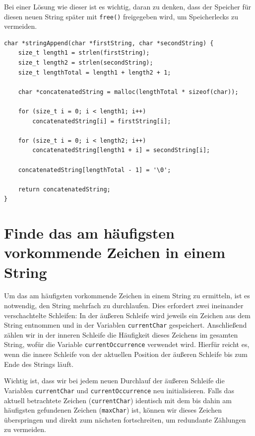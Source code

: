 Bei einer Lösung wie dieser ist es wichtig, daran zu denken, dass der Speicher
für diesen neuen String später mit \texttt{free()} freigegeben wird, um
Speicherlecks zu vermeiden.

\begin{verbatim}
char *stringAppend(char *firstString, char *secondString) {
    size_t length1 = strlen(firstString);
    size_t length2 = strlen(secondString);
    size_t lengthTotal = length1 + length2 + 1;

    char *concatenatedString = malloc(lengthTotal * sizeof(char));

    for (size_t i = 0; i < length1; i++)
        concatenatedString[i] = firstString[i];

    for (size_t i = 0; i < length2; i++)
        concatenatedString[length1 + i] = secondString[i];

    concatenatedString[lengthTotal - 1] = '\0';

    return concatenatedString;
}
\end{verbatim}





\chapter{Finde das am häufigsten vorkommende Zeichen in einem String}

Um das am häufigsten vorkommende Zeichen in einem String zu ermitteln, ist es
notwendig, den String mehrfach zu durchlaufen. Dies erfordert zwei ineinander
verschachtelte Schleifen: In der äußeren Schleife wird jeweils ein Zeichen aus
dem String entnommen und in der Variablen \texttt{currentChar}
gespeichert. Anschließend zählen wir in der inneren Schleife die Häufigkeit
dieses Zeichens im gesamten String, wofür die Variable
\texttt{currentOccurrence} verwendet wird. Hierfür reicht es, wenn die
innere Schleife von der aktuellen Position der äußeren Schleife bis zum Ende des
Strings läuft.

Wichtig ist, dass wir bei jedem neuen Durchlauf der äußeren Schleife die
Variablen \texttt{currentChar} und \texttt{currentOccurrence} neu
initialisieren. Falls das aktuell betrachtete Zeichen
(\texttt{currentChar}) identisch mit dem bis dahin am häufigsten
gefundenen Zeichen (\texttt{maxChar}) ist, können wir dieses Zeichen
überspringen und direkt zum nächsten fortschreiten, um redundante Zählungen zu
vermeiden.

